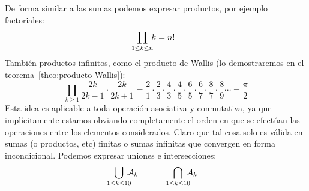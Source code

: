   De forma similar a las sumas podemos expresar productos,
  por ejemplo factoriales:
  \begin{align*}
    \prod_{\mathclap{1 \le k \le n}} \; k
      = n!
  \end{align*}
  También productos infinitos,
  como el producto de Wallis%
  (lo demostraremos en el teorema~\ref{theo:producto-Wallis}):
  \begin{equation*}
    \prod_{k \ge 1} \frac{2 k}{2 k - 1} \cdot \frac{2 k}{2 k + 1}
      = \frac{2}{1} \cdot \frac{2}{3}
	  \cdot \frac{4}{3} \cdot \frac{4}{5}
	  \cdot \frac{6}{5} \cdot \frac{6}{7}
	  \cdot \frac{8}{7} \cdot \frac{8}{9} \cdots
      = \frac{\pi}{2}
  \end{equation*}
  Esta idea es aplicable a toda operación asociativa y conmutativa,
  ya que implícitamente estamos obviando completamente el orden
  en que se efectúan las operaciones
  entre los elementos considerados.
  Claro que tal cosa solo es válida en sumas
  (o productos, etc)
  finitas
  o sumas infinitas que convergen en forma incondicional.
  Podemos expresar
  uniones e intersecciones:
  \begin{equation*}
    \bigcup_{\mathclap{1 \le k \le 10}} \; \mathcal{A}_k
    \hspace{4em}
    \bigcap_{\mathclap{1 \le k \le 10}} \; \mathcal{A}_k
  \end{equation*}

